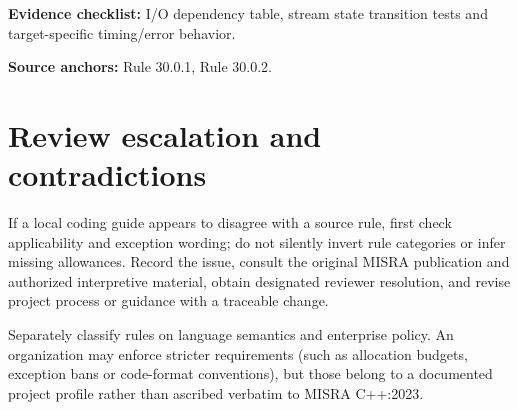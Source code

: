 \documentclass[10pt,letterpaper]{article}
\begin{document}
\textbf{Evidence checklist:} I/O dependency table, stream state transition tests and target-specific timing/error behavior.

\textbf{Source anchors:} Rule 30.0.1, Rule 30.0.2.

\section{Review escalation and contradictions}
If a local coding guide appears to disagree with a source rule, first check applicability and exception wording; do not silently invert rule categories or infer missing allowances. Record the issue, consult the original MISRA publication and authorized interpretive material, obtain designated reviewer resolution, and revise project process or guidance with a traceable change.

Separately classify rules on language semantics and enterprise policy. An organization may enforce stricter requirements (such as allocation budgets, exception bans or code-format conventions), but those belong to a documented project profile rather than ascribed verbatim to MISRA C++:2023.
\end{document}
